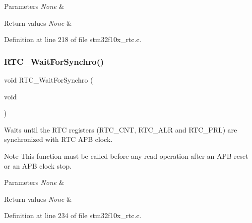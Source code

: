 \begin{DoxyParams}{Parameters}
{\em None} & \\
\hline
\end{DoxyParams}

\begin{DoxyRetVals}{Return values}
{\em None} & \\
\hline
\end{DoxyRetVals}


Definition at line 218 of file stm32f10x\+\_\+rtc.\+c.

\mbox{\label{group___r_t_c___exported___functions_gaca4346e0dc15dccc15179786b28450db}} 
\subsubsection{\texorpdfstring{R\+T\+C\+\_\+\+Wait\+For\+Synchro()}{RTC\_WaitForSynchro()}}
{\footnotesize\ttfamily void R\+T\+C\+\_\+\+Wait\+For\+Synchro (\begin{DoxyParamCaption}\item[{void}]{ }\end{DoxyParamCaption})}



Waits until the R\+TC registers (R\+T\+C\+\_\+\+C\+NT, R\+T\+C\+\_\+\+A\+LR and R\+T\+C\+\_\+\+P\+RL) are synchronized with R\+TC A\+PB clock. 

\begin{DoxyNote}{Note}
This function must be called before any read operation after an A\+PB reset or an A\+PB clock stop. 
\end{DoxyNote}

\begin{DoxyParams}{Parameters}
{\em None} & \\
\hline
\end{DoxyParams}

\begin{DoxyRetVals}{Return values}
{\em None} & \\
\hline
\end{DoxyRetVals}


Definition at line 234 of file stm32f10x\+\_\+rtc.\+c.

